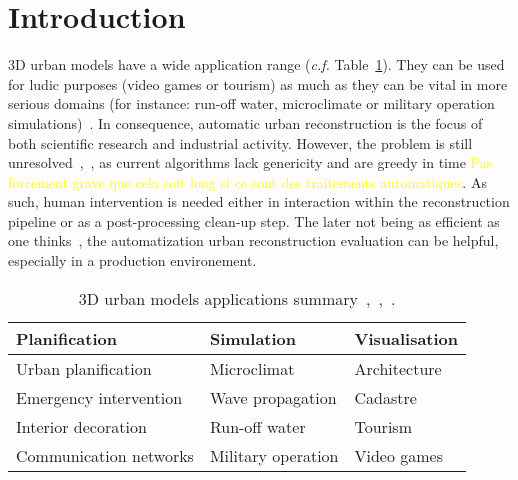 \documentclass[runningheads]{llncs}
\begin{document}
\section{Introduction}
    3D urban models have a wide application range (\textit{c.f.} Table~\ref{tab::3d_applications}). They can be used for ludic purposes (video games or tourism) as much as they can be vital in more serious domains (for instance: run-off water, microclimate or military operation simulations)~\cite{Biljecki2015}. In consequence, automatic urban reconstruction is the focus of both scientific research and industrial activity. However, the problem is still unresolved~\cite{Musialski2012},~\cite{rottensteiner2014results}, as current algorithms lack genericity and are greedy in time \textcolor{yellow}{Pas forcement grave que cela soit long si ce sont des traitements automatiques}. As such, human intervention is needed either in interaction within the reconstruction pipeline or as a post-processing clean-up step. The later not being as efficient as one thinks~\cite{Musialski2012}, the automatization urban reconstruction evaluation can be helpful, especially in a production environement.
    \begin{table}[H]
        \begin{center}
            \begin{tabular}{l l l}
                \toprule
                Planification & Simulation & Visualisation \\
                \midrule
                Urban planification & Microclimat & Architecture \\
                Emergency intervention & Wave propagation & Cadastre \\
                Interior decoration & Run-off water & Tourism \\
                Communication networks & Military operation & Video games \\
                \bottomrule
            \end{tabular}
            \caption{\label{tab::3d_applications} 3D urban models applications summary~\cite{Biljecki2015},~\cite{Scholze2002},~\cite{Wate2015}.}
        \end{center}
    \end{table}
\end{document}
